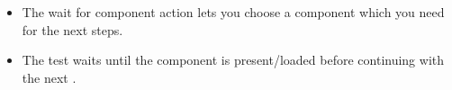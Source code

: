 %
\begin{itemize}
\item The wait for component action lets you choose a component which you need for the next steps.
\item The test waits until the component is present/loaded before continuing with the next \gdstep{}.
\end{itemize}

